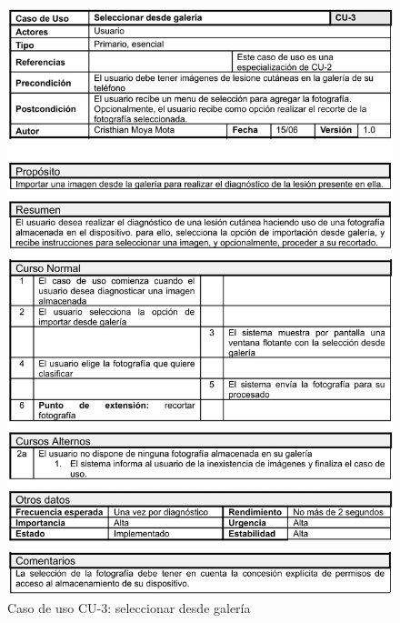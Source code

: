   \begin{figure}[H]
	\centering
	\includegraphics[scale=0.85]{imagenes/cu-3.png}
	\caption{Caso de uso CU-3: seleccionar desde galería}
	\label{fig:cu3}
\end{figure}

